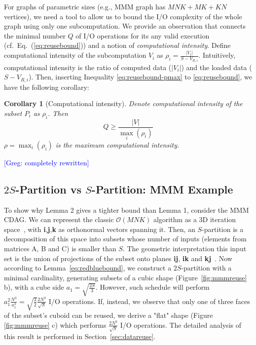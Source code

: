 \documentclass[sigplan,review,anonymous]{acmart}\settopmatter{printfolios=true,printccs=false,printacmref=false}
\newtheorem*{corollary*}{Corollary}
\newcommand\greg[1]{\textcolor{blue}{[Greg: #1]}}
\begin{document}
For graphs of parametric sizes (e.g., MMM graph has $MNK + MK + KN$ vertices), 
we need a tool to allow us to bound the I/O complexity of the whole graph using 
only one subcomputation. We provide an observation that connects the minimal 
number $Q$ of
I/O operations for its any valid execution
(cf.~Eq.~(\ref{eq:reusebound})) and a notion
of \emph{computational intensity}.
%
Define computational intensity of the subcomputation $V_i$ as $\rho_i =
\frac{|V_i|}{S-V_{R,i}}$. Intuitively, computational intensity is the ratio of 
computed data ($|V_i|$) and the loaded data ($S-V_{R,i}$).
Then, inserting Inequality \ref{eq:reusebound-pmax} to \ref{eq:reusebound}, we 
have the following corollary:

\begin{corollary*}[Computational intensity]
\label{cor:q}
Denote computational intensity of the subset $P_i$ as $\rho_i$. Then
\begin{equation}
Q \ge \frac{|V|}{\max_i(\rho_i)}
\end{equation} 
$\rho = \max_i(\rho_i)$ is the \emph{maximum} computational intensity.
\end{corollary*}


\greg{completely rewritten}
\subsection{$2S$-Partition vs $S$-Partition: MMM Example}

To show why Lemma 2 gives a tighter bound than Lemma 1, consider the MMM CDAG.
We can represent the classic $\mathcal{O}(MNK)$ algorithm as a 3D iteration
space~\cite{tiling}, with \textbf{i},\textbf{j},\textbf{k} as orthonormal 
vectors spanning it. Then, 
an $S$-partition is a decomposition of this space
into subsets whose number of inputs (elements from matrices A, B and C) is 
smaller than $S$. The geometric interpretation this input set is the union of 
projections of the subset onto planes \textbf{ij}, \textbf{ik} and 
\textbf{kj}~\cite{loomisApplied}. Now according to Lemma~\ref{eq:redbluebound}, 
we construct a
$2S$-partition with a minimal cardinality, generating subsets of a cubic shape
(Figure~\ref{fig:mmmreuse} b), with a cube side $a_1 = \sqrt{\frac{2S}{3}}$.
However, such schedule will perform $a_1^2 \frac{N^3}{a_1^3} =
\sqrt{\frac{3}{2}}\frac{2N^3}{\sqrt{S}}$ I/O operations. If, instead, we
observe that only one of three faces of the subset's cuboid can be reused, we
derive a "flat" shape (Figure \ref{fig:mmmreuse} c) which performs
$\frac{2N^3}{\sqrt{S}}$ I/O operations. The detailed analysis of this result is
performed in Section~\ref{sec:datareuse}.
\end{document}
